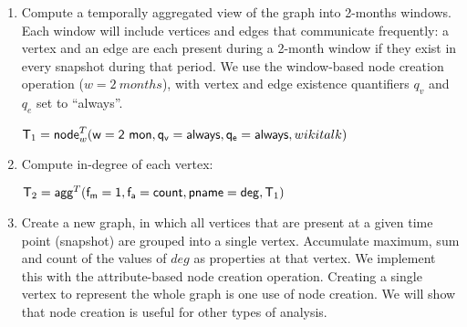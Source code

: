 \begin{enumerate}[noitemsep,,itemindent=\dimexpr\labelwidth+\labelsep\relax,leftmargin=0pt]
\item Compute a temporally aggregated view of the graph into 2-months
  windows.  Each window will include vertices and edges that
  communicate frequently: a vertex and an edge are each present during
  a 2-month window if they exist in every snapshot during that period.
  We use the window-based node creation operation ($w=2~months$), with
  vertex and edge existence quantifiers $q_v$ and $q_e$ set to
  ``always''.


\begin{center}
$\mathsf{T}_1 = \textsf{node}^T_w(\mathsf{w=2~mon},\mathsf{q_v=always},\mathsf{q_e=always},wikitalk)$
\end{center}

\item Compute in-degree of each vertex:

\begin{center}
$\mathsf{T}_2 = \textsf{agg}^T(\mathsf{f_m=1},\mathsf{f_a=count},\mathsf{pname=deg},\mathsf{T}_1)$
\end{center}

\item Create a new graph, in which all vertices that are present at a
  given time point (snapshot) are grouped into a single vertex.
  Accumulate maximum, sum and count of the values of $deg$ as
  properties at that vertex.  We implement this with the
  attribute-based node creation operation.  Creating a single vertex
  to represent the whole graph is one use of node creation.  We will
  show that node creation is useful for other types of analysis.


\end{enumerate}
